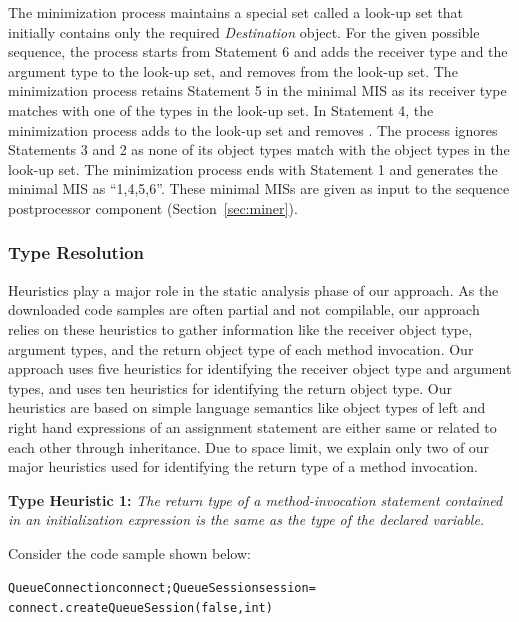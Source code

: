 \documentclass{fp035-thummalapenta}
\begin{document}
The minimization process maintains a special set called a look-up set
that initially contains only the required \emph{Destination} object.
For the given possible sequence, the process starts from Statement 6
and adds the receiver type  and the
argument type  to the look-up set, and removes
 from the look-up set. The minimization
process retains Statement 5 in the minimal MIS as its receiver type
matches with one of the types in the look-up set. In Statement 4,
the minimization process adds  to the look-up set and
removes . The process ignores Statements
3 and 2 as none of its object types match with the object types in
the look-up set. The minimization process ends with Statement 1 and
generates the minimal MIS as ``1,4,5,6''. These minimal MISs are
given as input to the sequence postprocessor component
(Section~\ref{sec:miner}).
\subsubsection{Type Resolution}
\label{sec:heuristics}

Heuristics play a major role in the static analysis phase of our
approach. As the downloaded code samples are often partial and not
compilable, our approach relies on these heuristics to gather
information like the receiver object type, argument types, and the
return object type of each method invocation. Our approach uses five
heuristics for identifying the receiver object type and argument
types, and uses ten heuristics for identifying the return object
type. Our heuristics are based on simple language semantics like
object types of left and right hand expressions of an assignment
statement are either same or related to each other through
inheritance. Due to space limit, we explain only two of our
major heuristics used for identifying the return type of a method
invocation.

\textbf{Type Heuristic 1:} \emph{The return type of a
method-invocation statement contained in an initialization
expression is the same as the type of the declared variable.}

Consider the code sample shown below:
\begin{CodeOut}
\begin{alltt}
QueueConnection connect; QueueSession session =
\hspace*{0.4in}connect.createQueueSession(false,int)
\end{alltt}
\end{CodeOut}
\end{document}
